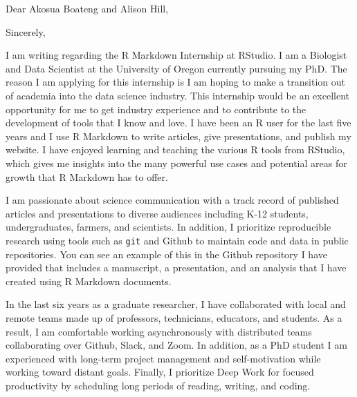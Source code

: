 \documentclass[10pt,letterpaper,sans]{moderncv}        %
\begin{document}

\clearpage
\date{March 12, 2021}
\opening{Dear Akosua Boateng and Alison Hill,}
\closing{Sincerely,}
\makelettertitle

I am writing regarding the R Markdown Internship at RStudio. I am a Biologist
and Data Scientist at the University of Oregon currently pursuing my PhD. The
reason I am applying for this internship is I am hoping to make a transition out
of academia into the data science industry. This internship would be an
excellent opportunity for me to get industry experience and to contribute to the
development of tools that I know and love. I have been an R user for the last
five years and I use R Markdown to write articles, give presentations, and
publish my website. I have enjoyed learning and teaching the various R
tools from RStudio, which gives me insights into the many powerful
use cases and potential areas for growth that R Markdown has to offer.

I am
passionate about science communication with a track record of published
articles and presentations to diverse audiences including K-12
students, undergraduates, farmers, and scientists. In addition, I prioritize
reproducible research using tools such as \texttt{git} and Github
to maintain code and data in public repositories. You can see an example of this
in the Github
repository I have provided that includes a manuscript, a
presentation, and an analysis that I have created using R Markdown documents.

In the last six years as a graduate researcher, I have collaborated with local
and remote teams made up of professors, technicians, educators,
and students. As a result, I am comfortable working asynchronously with distributed teams collaborating over Github, Slack, and Zoom. In addition, as a PhD student
I am experienced with long-term project management and self-motivation while
working toward distant goals. Finally, I prioritize Deep Work for focused
productivity by scheduling long periods of reading, writing, and coding.
\end{document}
